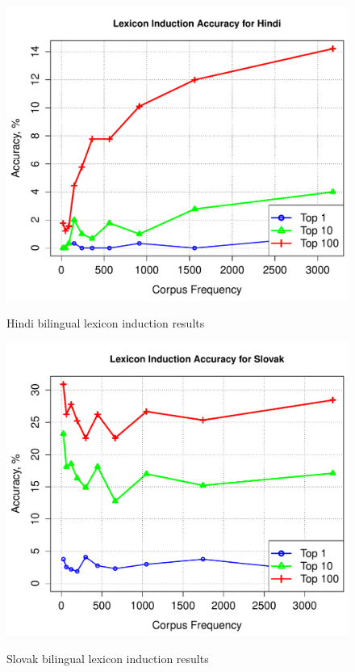 \documentclass[11pt]{article}
\begin{document}
\begin{figure}
\vskip 0.0in
\begin{center}
\includegraphics[width=0.9 \linewidth]{../byFreqGraphs/hi/lexinductnew.pdf}
\vskip -0.15in
\caption{Hindi bilingual lexicon induction results}
\vskip -0.2in
\label{fig:bli.hi} 
\end{center}
\end{figure}



\begin{figure}
\vskip 0.0in
\begin{center}
\includegraphics[width=0.9 \linewidth]{../byFreqGraphs/sk/lexinductnew.pdf}
\vskip -0.15in
\caption{Slovak bilingual lexicon induction results}
\vskip -0.2in
\label{fig:bli.sk} 
\end{center}
\end{figure}
\end{document}
